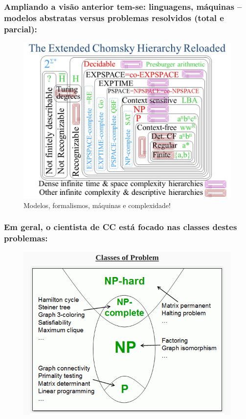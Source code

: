\documentclass[10pt]{beamer}
\begin{document}
\begin{frame}[fragile]

\frametitle{Ampliando a visão anterior tem-se: linguagens, máquinas -- modelos abstratas  versus problemas resolvidos (total e parcial): }

\begin{figure}[!ht]
\centering
\includegraphics[height =.65\textheight,width=.8\textwidth]
{figuras/Extended+Chomsky+Hierarchy.jpg}
\caption{Modelos, formalismos, máquinas e complexidade!}
\end{figure}

\end{frame}


\begin{frame}[fragile]
\frametitle{Em geral, o cientista de CC está focado nas classes destes problemas:}
\begin{figure}[!ht]
	\centering
	\includegraphics[height =.7\textheight,width=.8\textwidth]
	{figuras/classes_de_problemas.png}
\end{figure}

\end{frame}
\end{document}
